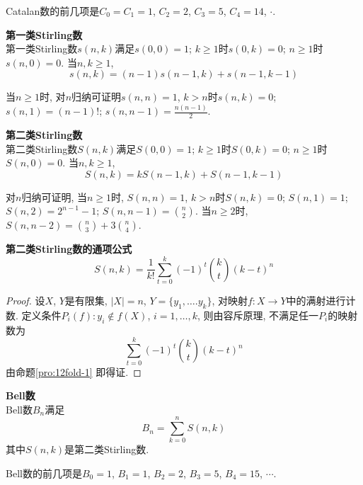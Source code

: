 Catalan数的前几项是$C_0=C_1=1$, $C_2=2$, $C_3=5$, $C_4=14$, $\cdot$.  

\begin{dfn} \textbf{第一类Stirling数}\\
第一类Stirling数$s(n,k)$满足$s(0,0)=1$; $k\ge 1$时$s(0,k)=0$; $n\ge 1$时$s(n,0)=0$. 当$n,k\ge 1$, 
\begin{equation}
    s(n,k)=(n-1)s(n-1,k)+s(n-1,k-1)
\end{equation}
\end{dfn}
当$n\ge 1$时, 对$n$归纳可证明$s(n,n)=1$, $k>n$时$s(n,k)=0$; $s(n,1)=(n-1)!$; $s(n,n-1)=\frac{n(n-1)}{2}$.

\begin{dfn} \textbf{第二类Stirling数}\\
第二类Stirling数$S(n,k)$满足$S(0,0)=1$; $k\ge 1$时$S(0,k)=0$; $n\ge 1$时$S(n,0)=0$. 当$n,k\ge 1$, 
\begin{equation}
    S(n,k)=kS(n-1,k)+S(n-1,k-1)
\end{equation}
\end{dfn}
对$n$归纳可证明, 当$n\ge 1$时, $S(n,n)=1$, $k>n$时$S(n,k)=0$; $S(n,1)=1$; $S(n,2)=2^{n-1}-1$; $S(n,n-1)=\binom{n}{2}$. 当$n\ge 2$时, $S(n,n-2)=\binom{n}{3}+3\binom{n}{4}$.

\begin{pro}\textbf{第二类Stirling数的通项公式}\\
\begin{equation}
    S(n,k)=\frac{1}{k!} \sum_{t=0}^k (-1)^t \binom{k}{t} (k-t)^n
\end{equation}
\end{pro}

\begin{proof}
设$X$, $Y$是有限集, $|X|=n$, $Y=\{y_1,\dots.y_k\}$, 对映射$f:X\to Y$中的满射进行计数. 定义条件$P_i(f): y_i \notin f(X)$, $i=1,\dots,k$, 则由容斥原理, 不满足任一$P_i$的映射数为
\begin{equation*}
    \sum_{t=0}^k (-1)^t \binom{k}{t} (k-t)^n
\end{equation*}
由命题\ref{pro:12fold-1} 即得证.  
\end{proof}

\begin{dfn} \textbf{Bell数}\\
Bell数$B_n$满足
\begin{equation}
    B_n=\sum_{k=0}^n S(n,k)
\end{equation}
其中$S(n,k)$是第二类Stirling数. 
\end{dfn}
Bell数的前几项是$B_0=1$, $B_1=1$, $B_2=2$, $B_3=5$, $B_4=15$, $\cdots$. 

